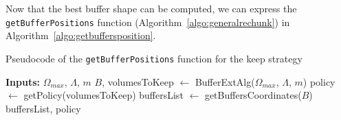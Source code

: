 \documentclass[conference]{IEEEtran}
\begin{document}
Now that the best buffer shape can be computed, we can express the
\texttt{getBufferPositions} function (Algorithm~\ref{algo:generalrechunk}) in
Algorithm~\ref{algo:getbuffersposition}.

\begin{algorithm}
  \caption{Pseudocode of the \texttt{getBufferPositions} function for the keep strategy}
  \label{algo:getbuffersposition}
  \begin{algorithmic}[1]
  \STATE \textbf{Inputs:} $\Omega_{max}$, $\Lambda$, $m$
  \STATE $B$, volumesToKeep $\leftarrow$ BufferExtAlg($\Omega_{max}$, $\Lambda$, $m$)
  \STATE policy $\leftarrow$ getPolicy(volumesToKeep)
  \STATE buffersList $\leftarrow$ getBuffersCoordinates($B$)
  \RETURN buffersList, policy
  \end{algorithmic}
\end{algorithm}
\end{document}

